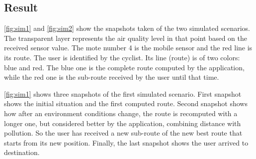 \subsection{Result}

\autoref{fig:sim1} and \autoref{fig:sim2} show the snapshots taken of the two simulated scenarios.
The transparent layer represents the air quality level in that point based on the received sensor value.
The mote number 4 is the mobile sensor and the red line is its route.
The user is identified by the cyclist. 
Its line (route) is of two colors: blue and red.
The blue one is the complete route computed by the application, while the red one is the sub-route received by the user until that time. 

\autoref{fig:sim1} shows three snapshots of the first simulated scenario.
First snapshot shows the initial situation and the first computed route.
Second snapshot shows how after an environment conditions change, the route is recomputed with a longer one, but considered better by the application, combining distance with pollution. 
So the user has received a new sub-route of the new best route that starts from its new position.
Finally, the last snapshot shows the user arrived to destination.
% 
